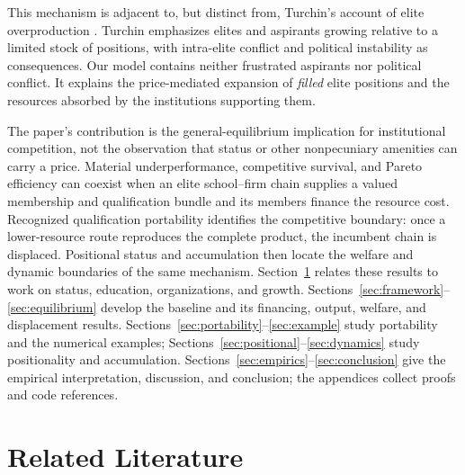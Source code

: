 \documentclass[12pt,letterpaper]{article}
\theoremstyle{definition}
\begin{document}
This mechanism is adjacent to, but distinct from, Turchin's account of elite
overproduction \citep{turchin2023endtimes}.
Turchin emphasizes elites and aspirants growing relative to a limited stock of positions,
with intra-elite conflict and political instability as consequences.
Our model contains neither frustrated aspirants nor political conflict.
It explains the price-mediated expansion of \emph{filled} elite positions and the
resources absorbed by the institutions supporting them.

The paper's contribution is the general-equilibrium implication for institutional
competition, not the observation that status or other nonpecuniary amenities can carry a
price.
Material underperformance, competitive survival, and Pareto efficiency can coexist when
an elite school--firm chain supplies a valued membership and qualification bundle and its
members finance the resource cost.
Recognized qualification portability identifies the competitive boundary: once a
lower-resource route reproduces the complete product, the incumbent chain is displaced.
Positional status and accumulation then locate the welfare and dynamic boundaries of the
same mechanism.
Section~\ref{sec:lit} relates these results to work on status, education, organizations,
and growth.
Sections~\ref{sec:framework}--\ref{sec:equilibrium} develop the baseline and its
financing, output, welfare, and displacement results.
Sections~\ref{sec:portability}--\ref{sec:example} study portability and the numerical
examples; Sections~\ref{sec:positional}--\ref{sec:dynamics} study positionality and
accumulation.
Sections~\ref{sec:empirics}--\ref{sec:conclusion} give the empirical interpretation,
discussion, and conclusion; the appendices collect proofs and code references.

\section{Related Literature}\label{sec:lit}
\end{document}
